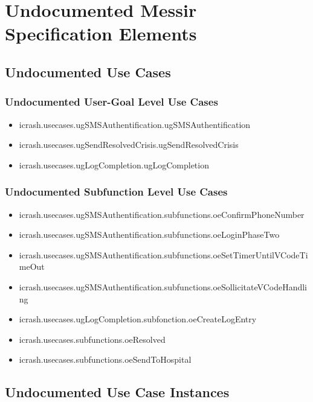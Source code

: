 	
\chapter{Undocumented Messir Specification Elements}


\section[Undocumented Use Cases]{Undocumented Use Cases}


\subsection[Undocumented Use Cases - User-Goal Level]{Undocumented User-Goal Level Use Cases}
\begin{itemize}
\item icrash.usecases.ugSMSAuthentification.ugSMSAuthentification 
\item icrash.usecases.ugSendResolvedCrisis.ugSendResolvedCrisis 
\item icrash.usecases.ugLogCompletion.ugLogCompletion 
\end{itemize}

\subsection[Undocumented Use Cases - Subfunction Level]{Undocumented Subfunction Level Use Cases}
\begin{itemize}
\item icrash.usecases.ugSMSAuthentification.subfunctions.oeConfirmPhoneNumber 
\item icrash.usecases.ugSMSAuthentification.subfunctions.oeLoginPhaseTwo 
\item icrash.usecases.ugSMSAuthentification.subfunctions.oeSetTimerUntilVCodeTimeOut 
\item icrash.usecases.ugSMSAuthentification.subfunctions.oeSollicitateVCodeHandling 
\item icrash.usecases.ugLogCompletion.subfonction.oeCreateLogEntry 
\item icrash.usecases.subfunctions.oeResolved 
\item icrash.usecases.subfunctions.oeSendToHospital 
\end{itemize}





\section[Undocumented Use Case Instances]{Undocumented Use Case Instances}


